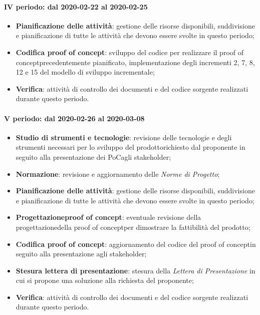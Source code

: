 \paragraph*{IV periodo: dal 2020-02-22 al 2020-02-25}
\begin{itemize}
	\item \textbf{Pianificazione delle attività}: gestione delle risorse disponibili, suddivisione e pianificazione di tutte le attività che devono essere svolte in questo periodo;
	\item \textbf{Codifica proof of concept}\glo: sviluppo del codice per realizzare il proof of concept\glosp precedentemente pianificato, implementazione degli incrementi 2, 7, 8, 12 e 15 del modello di sviluppo incrementale;
	\item \textbf{Verifica}: attività di controllo dei documenti e del codice sorgente realizzati durante questo periodo.
\end{itemize}

\paragraph*{V periodo: dal 2020-02-26 al 2020-03-08}
\begin{itemize}
	\item \textbf{Studio di strumenti e tecnologie}: revisione delle tecnologie e degli strumenti necessari per lo sviluppo del prodotto\glosp richiesto dal proponente in seguito alla presentazione dei PoC\glosp agli stakeholder\glo;
	\item \textbf{Normazione}: revisione e aggiornamento delle \textit{Norme di Progetto};
	\item \textbf{Pianificazione delle attività}: gestione delle risorse disponibili, suddivisione e pianificazione di tutte le attività che devono essere svolte in questo periodo;
	\item \textbf{Progettazione}\glosp\textbf{proof of concept}\glo: eventuale revisione della progettazione\glosp della proof of concept\glosp per dimostrare la fattibilità del prodotto\glo;
	\item \textbf{Codifica proof of concept}\glo: aggiornamento del codice del proof of concept\glosp in seguito alla presentazione agli stakeholder\glo;
	\item \textbf{Stesura lettera di presentazione}: stesura della \textit{Lettera di Presentazione} in cui si propone una soluzione alla richiesta del proponente;
	\item \textbf{Verifica}: attività di controllo dei documenti e del codice sorgente realizzati durante questo periodo.
\end{itemize}

